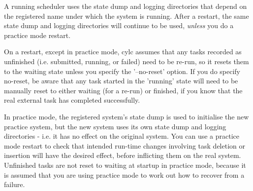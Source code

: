 
A running scheduler uses the state dump and logging directories that
depend on the registered name under which the system is running.
After a restart, the same state dump and logging directories will
continue to be used, {\em unless} you do a practice mode restart. 

On a restart, except in practice mode, cylc assumes that any tasks
recorded as unfinished (i.e. submitted, running, or failed) need to be
re-run, so it resets them to the waiting state unless you specify the
'--no-reset' option. If you do specify no-reset, be aware that any task
started in the 'running' state will need to be manually reset to either
waiting (for a re-run) or finished, if you know that the real external
task has completed successfully.

In practice mode, the registered system's state dump is used to
initialise the new practice system, but the new system uses its own
state dump and logging directories - i.e. it has no effect on the
original system. You can use a practice mode restart to check that
intended run-time changes involving task deletion or insertion will have
the desired effect, before inflicting them on the real system.
Unfinished tasks are not reset to waiting at startup in practice mode,
because it is assumed that you are using practice mode to work out how
to recover from a failure. 
